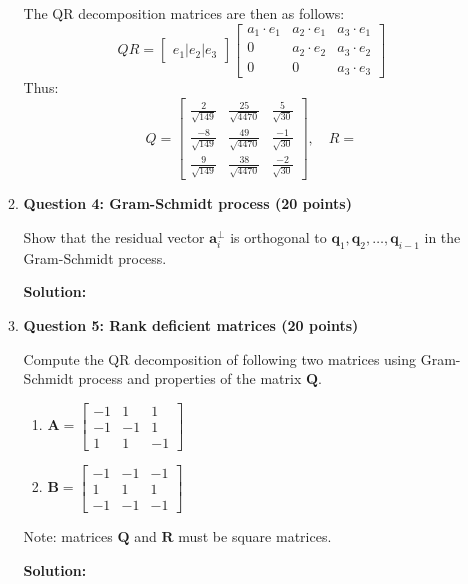 \documentclass[11pt,letterpaper]{article}
\begin{document}
\begin{enumerate}
\begin{enumerate}
The QR decomposition matrices are then as follows:
\[QR = \begin{bmatrix}
e_1 | e_2 | e_3
\end{bmatrix}
\begin{bmatrix}
a_1 \cdot e_1 & a_2 \cdot e_1 & a_3 \cdot e_1 \\
0 & a_2 \cdot e_2 & a_3 \cdot e_2 \\
0 & 0 & a_3 \cdot e_3
\end{bmatrix}\]
Thus:
\[Q = \begin{bmatrix}
\frac{2}{\sqrt{149}} & \frac{25}{\sqrt{4470}} & \frac{5}{\sqrt{30}} \\
\frac{-8}{\sqrt{149}} & \frac{49}{\sqrt{4470}} & \frac{-1}{\sqrt{30}} \\
\frac{9}{\sqrt{149}} & \frac{38}{\sqrt{4470}} & \frac{-2}{\sqrt{30}}
\end{bmatrix}, \quad R = \]

\newpage

\item[] \textbf{Question 4: Gram-Schmidt process (20 points)} 

Show that the residual vector $\mathbf{a}_i^{\perp}$ is orthogonal to $\mathbf{q}_1, \mathbf{q}_2,\dots, \mathbf{q}_{i-1}$ in the Gram-Schmidt process.

\textbf{Solution:}

\newpage

\item[] \textbf{Question 5: Rank deficient matrices (20 points)}

Compute the QR decomposition of following two matrices using Gram-Schmidt process and properties of the matrix $\mathbf{Q}$.
\begin{enumerate}
    \item $\mathbf{A} = \begin{bmatrix}
-1 & 1 & 1\\
-1 & -1 & 1\\
1 & 1 & -1
\end{bmatrix}$
\item $\mathbf{B} = \begin{bmatrix}
-1 & -1 & -1\\
1 & 1 & 1\\
-1 & -1 & -1
\end{bmatrix}$
\end{enumerate}
Note: matrices $\mathbf{Q}$ and $\mathbf{R}$ must be square matrices.

\textbf{Solution:}



\end{enumerate}
\end{enumerate}
\end{document}
